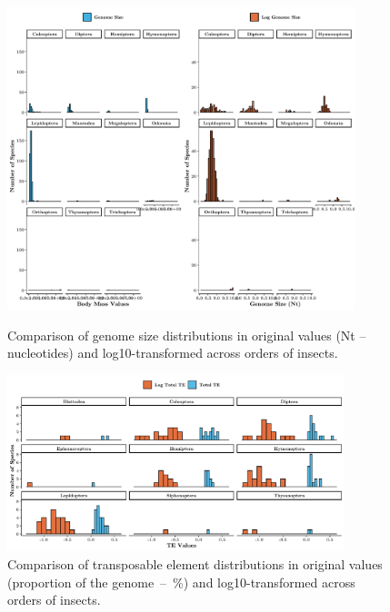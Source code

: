 \documentclass[11pt]{article}
\begin{document}
\begin{figure}[H]
    \centering
    \includegraphics[width=0.9\textwidth]{figures/Genome_Distributions.pdf}
    \caption{Comparison of genome size distributions in original values (Nt -- nucleotides) and log10-transformed across orders of insects.}
    \vspace{0.5cm}
    \includegraphics[width=0.875\textwidth]{figures/TE_Distributions.pdf}
    \caption{Comparison of transposable element distributions in original values (proportion of the genome~--~\%) and log10-transformed across orders of insects.}
    \label{fig:genome-te-distributions}
\end{figure}








\pagebreak
{}
\end{document}
